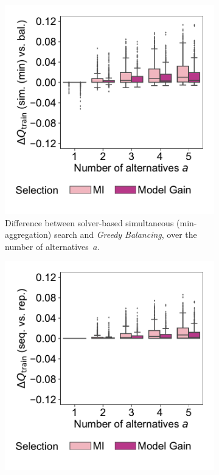 \documentclass{article}
\theoremstyle{definition}
\begin{document}
\begin{figure}[p]
	\centering
	\begin{subfigure}[t]{0.48\textwidth}
		\centering
		\includegraphics[width=\textwidth, trim=15 30 15 15, clip]{plots/afs-impact-search-heuristics-metric-diff-sim-num-alternatives.pdf}
		\caption{
			Difference between solver-based simultaneous (min-aggregation) search and \emph{Greedy Balancing}, over the number of alternatives~$a$.
		}
		\label{fig:afs:impact-search-heuristics-metric-diff-sim-num-alternatives}
	\end{subfigure}
	\hfill
	\begin{subfigure}[t]{0.48\textwidth}
		\centering
		\includegraphics[width=\textwidth, trim=15 30 15 15, clip]{plots/afs-impact-search-heuristics-metric-diff-seq-num-alternatives.pdf}

\end{subfigure}
\end{figure}
\end{document}
